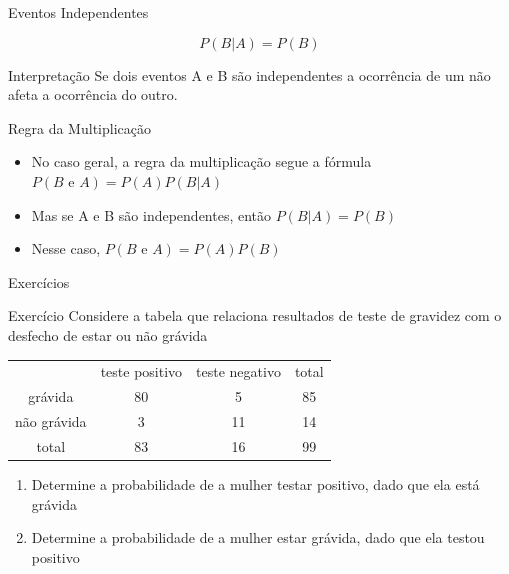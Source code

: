 \documentclass{beamer}
\begin{document}

\begin{frame}{Eventos Independentes}
  \begin{definition}
    \begin{displaymath}
      P(B|A) = P(B)
    \end{displaymath}
  \end{definition}
  \begin{block}{Interpretação}
    Se dois eventos A e B são independentes a ocorrência de um não
    afeta a ocorrência do outro.
  \end{block}
\end{frame}


\begin{frame}{Regra da Multiplicação}
  \begin{itemize}
  \item No caso geral, a regra da multiplicação segue a fórmula $P(B \text{ e } A) = P(A)P(B|A)$
  \item Mas se A e B são independentes, então $P(B|A) = P(B)$
  \item Nesse caso, $P(B \text{ e } A) = P(A)P(B)$
  \end{itemize}
\end{frame}

\begin{frame}{Exercícios}
  \begin{block}{Exercício}
    Considere a tabela que relaciona resultados de teste de gravidez
    com o desfecho de estar ou não grávida
    \begin{tabular}{ccc|c}
      & teste positivo & teste negativo & total\\
      grávida & 80 & 5 & 85\\
      não grávida & 3 & 11 & 14\\
      \hline
      total & 83 & 16 & 99\\
    \end{tabular}
    \begin{enumerate}
    \item Determine a probabilidade de a mulher testar positivo, dado
      que ela está grávida
    \item Determine a probabilidade de a mulher estar grávida, dado
      que ela testou positivo
    \end{enumerate}
  \end{block}
\end{frame}
\end{document}
